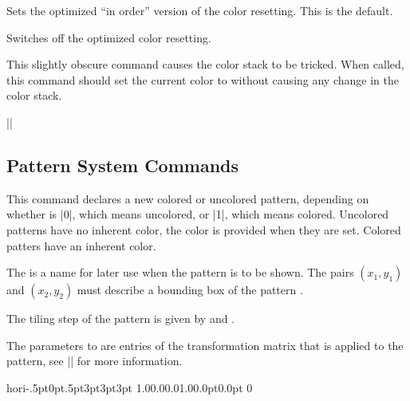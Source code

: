 \begin{command}{\pgfsys@color@reset@inordertrue}
    Sets the optimized ``in order'' version of the color resetting. This is the
    default.
\end{command}

\begin{command}{\pgfsys@color@reset@inorderfalse}
    Switches off the optimized color resetting.
\end{command}

\begin{command}{\pgfsys@color@unstacked{}}
    This slightly obscure command causes the color stack to be tricked. When
    called, this command should set the current color to 
    without causing any change in the color stack.

    \example ||
\end{command}


\subsection{Pattern System Commands}

\begin{command}{\pgfsys@declarepattern
    \allowbreak{}%
}
    This command declares a new colored or uncolored pattern, depending on
    whether  is |0|, which means uncolored, or |1|, which means
    colored. Uncolored patterns have no inherent color, the color is provided
    when they are set. Colored patters have an inherent color.

    The  is a name for later use when the pattern is to be shown.
    The pairs $(x_1,y_1)$ and $(x_2,y_2)$ must describe a bounding box of the
    pattern .

    The tiling step of the pattern is given by  and .

    The parameters  to  are entries of the transformation
    matrix that is applied to the pattern, see |\pgfsys@patternmatrix| for more
    information.

    \example
\begin{codeexample}
\pgfsys@declarepattern
    {hori}{-.5pt}{0pt}{.5pt}{3pt}{3pt}{3pt}%
    {1.0}{0.0}{0.0}{1.0}{0.0pt}{0.0pt}%
    {\pgfsys@moveto{0pt}{0pt}\pgfsys@lineto{0pt}{3pt}\pgfsys@stroke}
    {0}
\end{codeexample}
\end{command}


